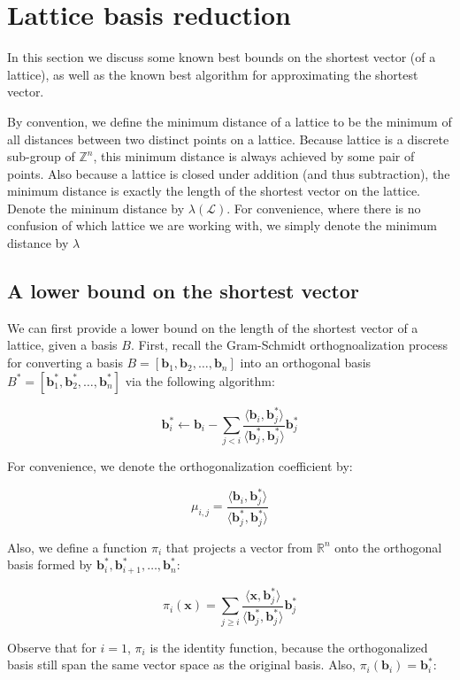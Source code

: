 \documentclass[letterpaper,12pt]{article}
\begin{document}
\section{Lattice basis reduction}
In this section we discuss some known best bounds on the shortest vector (of a lattice), as well as the known best algorithm for approximating the shortest vector.

By convention, we define the minimum distance of a lattice to be the minimum of all distances between two distinct points on a lattice. Because lattice is a discrete sub-group of $\mathbb{Z}^n$, this minimum distance is always achieved by some pair of points. Also because a lattice is closed under addition (and thus subtraction), the minimum distance is exactly the length of the shortest vector on the lattice. Denote the mininum distance by $\lambda(\mathcal{L})$. For convenience, where there is no confusion of which lattice we are working with, we simply denote the minimum distance by $\lambda$

\subsection{A lower bound on the shortest vector}
We can first provide a lower bound on the length of the shortest vector of a lattice, given a basis $B$. First, recall the Gram-Schmidt orthognoalization process for converting a basis $B = [\mathbf{b}_1, \mathbf{b}_2, \ldots, \mathbf{b}_n]$ into an orthogonal basis $B^\ast = [\mathbf{b}_1^\ast, \mathbf{b}_2^\ast, \ldots, \mathbf{b}_n^\ast]$ via the following algorithm:

$$
\mathbf{b}_i^\ast \leftarrow \mathbf{b}_i - \sum_{j<i}\frac{\langle \mathbf{b}_i, \mathbf{b}_j^*\rangle}{\langle \mathbf{b}_j^*, \mathbf{b}_j^*\rangle}\mathbf{b}_j^\ast
$$

For convenience, we denote the orthogonalization coefficient by:

$$
\mu_{i, j} = \frac{\langle \mathbf{b}_i, \mathbf{b}_j^*\rangle}{\langle \mathbf{b}_j^*, \mathbf{b}_j^*\rangle}
$$

Also, we define a function $\pi_i$ that projects a vector from $\mathbb{R}^n$ onto the orthogonal basis formed by $\mathbf{b}_i^\ast, \mathbf{b}_{i+1}^\ast, \ldots, \mathbf{b}_n^\ast$:

$$
\pi_i(\mathbf{x}) = \sum_{j\geq i}\frac{\langle \mathbf{x}, \mathbf{b}_j^\ast\rangle}{\langle \mathbf{b}_j^\ast, \mathbf{b}_j^\ast \rangle}\mathbf{b}_j^\ast
$$

Observe that for $i = 1$, $\pi_i$ is the identity function, because the orthogonalized basis still span the same vector space as the original basis. Also, $\pi_i(\mathbf{b}_i) = \mathbf{b}_i^\ast$:
\end{document}
